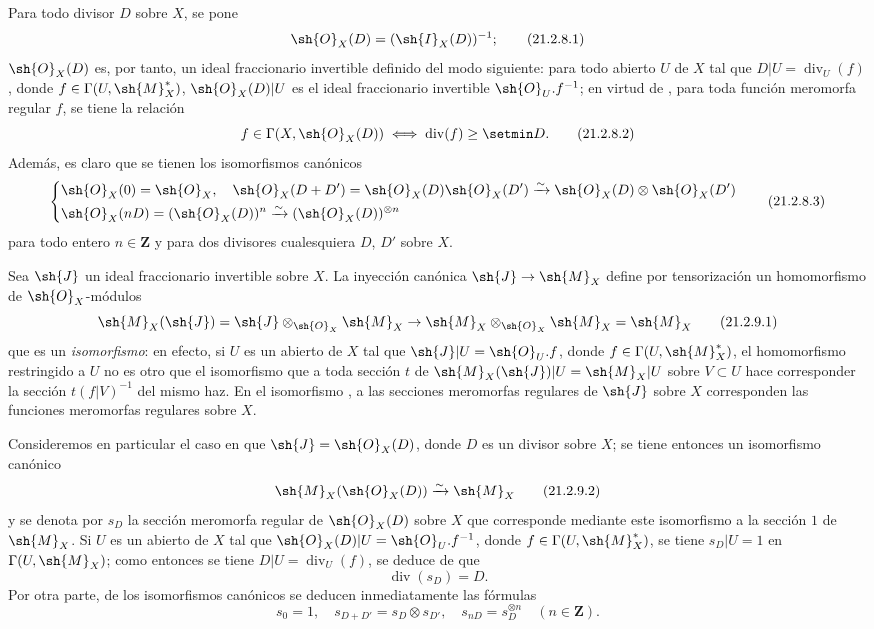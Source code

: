 \begin{env}[21.2.8]
\label{IV.21.2.8}
Para todo divisor $D$ sobre $X$, se pone
\[
\label{IV.21.2.8.1}
  \sh{O}_X(D)=(\sh{I}_X(D))^{-1};
  \tag{21.2.8.1}
\]
$\sh{O}_X(D)$ es, por tanto, un ideal fraccionario invertible definido del modo siguiente: para todo abierto $U$ de $X$ tal que $D|U=\operatorname{div}_U(f)$, donde $f\in\Gamma(U,\sh{M}_X^*)$, $\sh{O}_X(D)|U$ es el ideal
fraccionario invertible $\sh{O}_U.f^{-1}$;
en virtud de , para toda función meromorfa regular $f$, se tiene la relación
\[
\label{IV.21.2.8.2}
  f\in\Gamma(X,\sh{O}_X(D)) \iff \operatorname{div}(f)\geq\setmin D.
  \tag{21.2.8.2}
\]
Además, es claro que se tienen los isomorfismos canónicos 
\[
\label{IV.21.2.8.3}
  \left\{\begin{aligned}
    &\sh{O}_X(0)=\sh{O}_X,\quad \sh{O}_X(D+D')=\sh{O}_X(D)\sh{O}_X(D')\xrightarrow{\sim}\sh{O}_X(D)\otimes\sh{O}_X(D')\\
    &\sh{O}_X(nD)=(\sh{O}_X(D))^n\xrightarrow{\sim}(\sh{O}_X(D))^{\otimes n}
  \end{aligned}\right.
  \tag{21.2.8.3}
\]
para todo entero $n\in\mathbf{Z}$ y para dos divisores cualesquiera $D$, $D'$ sobre $X$.
\end{env}

\begin{env}[21.2.9]
\label{IV.21.2.9}
Sea $\sh{J}$ un ideal fraccionario invertible sobre $X$.
La inyección canónica $\sh{J}\to\sh{M}_X$ define por tensorización un homomorfismo de $\sh{O}_X$-módulos
\[
\label{IV.21.2.9.1}
  \sh{M}_X(\sh{J})=\sh{J}\otimes_{\sh{O}_X}\sh{M}_X\to\sh{M}_X\otimes_{\sh{O}_X}\sh{M}_X=\sh{M}_X
  \tag{21.2.9.1}
\]
que es un \emph{isomorfismo}: en efecto, si $U$ es un abierto de $X$ tal que $\sh{J}|U=\sh{O}_U.f$, donde $f\in\Gamma(U,\sh{M}_X^*)$, el homomorfismo  restringido a $U$ no es otro que el isomorfismo que a toda sección $t$ de $\sh{M}_X(\sh{J})|U=\sh{M}_X|U$ sobre $V\subset U$ hace corresponder la sección $t(f|V)^{-1}$ del mismo haz.
En el isomorfismo , a las secciones meromorfas regulares de $\sh{J}$ sobre $X$ corresponden las funciones meromorfas regulares sobre $X$.

Consideremos en particular el caso en que $\sh{J}=\sh{O}_X(D)$, donde $D$ es un divisor sobre $X$;
se tiene entonces un isomorfismo canónico
\[
\label{IV.21.2.9.2}
  \sh{M}_X(\sh{O}_X(D))\xrightarrow{\sim}\sh{M}_X
  \tag{21.2.9.2}
\]
y se denota por $s_D$ la sección meromorfa regular de $\sh{O}_X(D)$ sobre $X$ que corresponde mediante este isomorfismo a la sección $1$ de $\sh{M}_X$.
Si $U$ es un abierto de $X$ tal que $\sh{O}_X(D)|U=\sh{O}_U.f^{-1}$, donde $f\in\Gamma(U,\sh{M}_X^*)$, se tiene $s_D|U=1$ en $\Gamma(U,\sh{M}_X)$;
como entonces se tiene $D|U=\operatorname{div}_U(f)$, se deduce de  que
\[
\label{IV.21.2.9.3}
  \operatorname{div}(s_D)=D.
  \tag{21.2.9.3}
\]
Por otra parte, de los isomorfismos canónicos  se deducen inmediatamente las fórmulas
\[
\label{IV.21.2.9.4}
  s_0=1,\quad s_{D+D'}=s_D\otimes s_{D'},\quad s_{nD}=s_D^{\otimes n}\quad(n\in\mathbf{Z}).
  \tag{21.2.9.4}
\]
\end{env}

